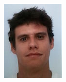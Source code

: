 \documentclass[paper=a4,fontsize=11pt]{temp} %
\begin{document}
\sepspace
\begin{minipage}{.15\linewidth}
   \includegraphics[width=\textwidth]{quim}
\end{minipage}      
\end{document}
